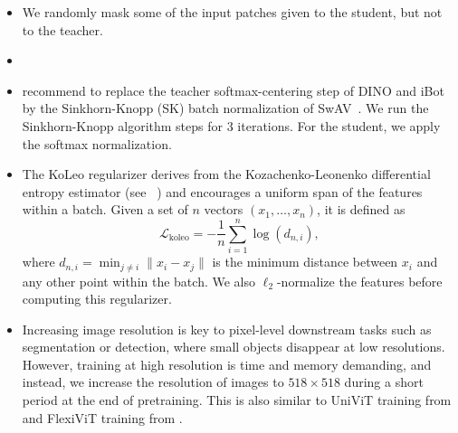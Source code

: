 \begin{itemize}
We learn the parameters of the student and build the teacher head with an exponential moving average of past iterates~\citep{he2020momentum}. 
\item
{}
We randomly mask some of the input patches given to the student, but not to the teacher.
\item
{}
\item
{}
\cite{ruan2022weighted} recommend to replace the teacher softmax-centering step of DINO and iBot by the Sinkhorn-Knopp (SK) batch normalization of SwAV~\citep{caron2020unsupervised}. 
We run the Sinkhorn-Knopp algorithm steps for 3 iterations.
For the student, we apply the softmax normalization.
\item
{}
The KoLeo regularizer derives from the Kozachenko-Leonenko differential entropy estimator (see ~\citet{beirlant1997nonparametric,delattre2017kozachenko}) and encourages a uniform span of the features within a batch. 
Given a set of $n$ vectors $(x_1,\dots,x_n)$, it is defined as $${\mathcal L}_{\mathrm{koleo}} = - \frac{1}{n} \sum_{i=1}^n \log( d_{n, i}),$$ where $ d_{n, i} = \min_{j \neq i} \| x_i - x_j \| $ is the minimum distance between $x_i$ and any other point within the batch. 
We also $\ell_2$-normalize the features before computing this regularizer. 
\item
{} 
Increasing image resolution is key to pixel-level downstream tasks such as segmentation or detection, where small objects disappear at low resolutions.
However, training at high resolution is time and memory demanding, and instead, we increase the resolution of images to $518\times 518$ during a short period at the end of pretraining. This is also similar to UniViT training from \cite{likhomanenko2021cape} and FlexiViT training from \cite{beyer2023flexivit}.
\end{itemize}


